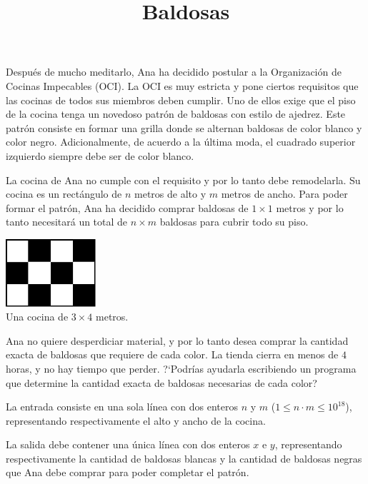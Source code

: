 \documentclass{oci}
\title{Baldosas}
\begin{document}
\begin{problemDescription}
  Después de mucho meditarlo, Ana ha decidido
  postular a la Organización de Cocinas Impecables (OCI).
  La OCI es muy estricta y pone ciertos requisitos que
  las cocinas de todos sus miembros deben cumplir.
  Uno de ellos exige que el piso de la cocina tenga un novedoso
  patrón de baldosas con estilo de ajedrez.
  Este patrón consiste en formar una grilla
  donde se alternan baldosas de color blanco y color negro.
  Adicionalmente, de acuerdo a la última moda, el cuadrado
  superior izquierdo siempre debe ser de color blanco.

  La cocina de Ana no cumple con el requisito y por lo tanto
  debe remodelarla.
  Su cocina es un rectángulo de $n$ metros de alto y $m$
  metros de ancho.
  Para poder formar el patrón, Ana ha decidido comprar baldosas de
  $1\times 1$ metros y por lo tanto necesitará un total de $n\times m$
  baldosas para cubrir todo su piso.

  \begin{center}
    \includegraphics[width=0.25\textwidth]{example-checkerboard.pdf} \\
    Una cocina de $3 \times 4$ metros.
  \end{center}

  Ana no quiere desperdiciar material, y por lo tanto desea comprar
  la cantidad exacta de baldosas que requiere de cada color.
  La tienda cierra en menos de $4$ horas, y no hay tiempo que perder.
  ?`Podrías ayudarla escribiendo un programa que determine la cantidad
  exacta de baldosas necesarias de cada color?
\end{problemDescription}

\begin{inputDescription}
  La entrada consiste en una sola línea con dos enteros $n$ y $m$
  ($1 \leq n \cdot m \leq 10^{18}$), representando respectivamente
  el alto y ancho de la cocina.
\end{inputDescription}

\begin{outputDescription}
  La salida debe contener una única línea con dos enteros $x$ e $y$,
  representando respectivamente la cantidad de baldosas blancas y
  la cantidad de baldosas negras que Ana debe comprar para poder
  completar el patrón.
\end{outputDescription}
\end{document}
